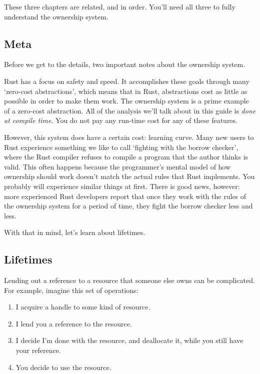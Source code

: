 \documentclass[a4paper,]{book}
\renewcommand*{\hypertarget}[3][\ar]{%
  \def\ar{#2}%
  \label{#1}%
  #3}
\providecommand{\tightlist}{%
  \setlength{\itemsep}{0pt}\setlength{\parskip}{0pt}}
\begin{document}
These three chapters are related, and in order. You'll need all three to
fully understand the ownership system.

\subsection{Meta}\label{meta-2}

Before we get to the details, two important notes about the ownership
system.

Rust has a focus on safety and speed. It accomplishes these goals
through many `zero-cost abstractions', which means that in Rust,
abstractions cost as little as possible in order to make them work. The
ownership system is a prime example of a zero-cost abstraction. All of
the analysis we'll talk about in this guide is \emph{done at compile
time}. You do not pay any run-time cost for any of these features.

However, this system does have a certain cost: learning curve. Many new
users to Rust experience something we like to call `fighting with the
borrow checker', where the Rust compiler refuses to compile a program
that the author thinks is valid. This often happens because the
programmer's mental model of how ownership should work doesn't match the
actual rules that Rust implements. You probably will experience similar
things at first. There is good news, however: more experienced Rust
developers report that once they work with the rules of the ownership
system for a period of time, they fight the borrow checker less and
less.

With that in mind, let's learn about lifetimes.

\hypertarget{lifetimes}{\subsection{Lifetimes}\label{lifetimes}}

Lending out a reference to a resource that someone else owns can be
complicated. For example, imagine this set of operations:

\begin{enumerate}
\def\labelenumi{\arabic{enumi}.}
\tightlist
\item
  I acquire a handle to some kind of resource.
\item
  I lend you a reference to the resource.
\item
  I decide I'm done with the resource, and deallocate it, while you
  still have your reference.
\item
  You decide to use the resource.
\end{enumerate}
\end{document}
